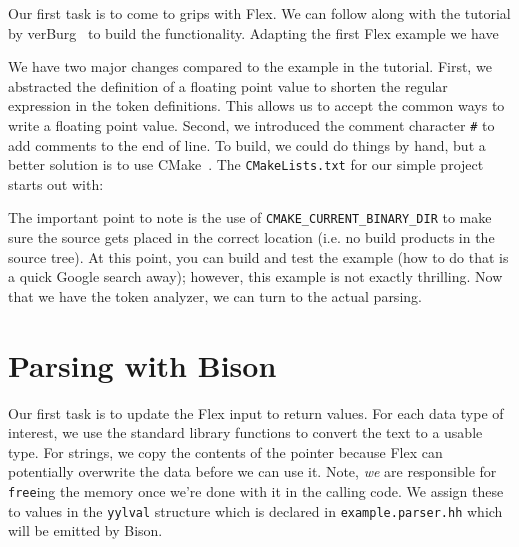 \documentclass{article}
\begin{document}
Our first task is to come to grips with Flex.  We can follow along with
the tutorial by verBurg~\cite{verburg_flex_2018} to build the
functionality.  Adapting the first Flex example we have

\begin{code block}
    
\end{code block}

We have two major changes compared to the example in the tutorial.
First, we abstracted the definition of a floating point value to shorten
the regular expression in the token definitions.  This allows us to
accept the common ways to write a floating point value.  Second, we
introduced the comment character \lstinline{#} to add comments to the
end of line.  To build, we could do things by hand, but a better
solution is to use CMake~\cite{kitware_cmake_2019}.  The
\lstinline{CMakeLists.txt} for our simple project starts out with:

\begin{code block}
    
\end{code block}

The important point to note is the use of \lstinline{CMAKE_CURRENT_BINARY_DIR}
to make sure the source gets placed in the correct location (i.e. no
build products in the source tree).  At this point, you can build and
test the example (how to do that is a quick Google search away);
however, this example is not exactly thrilling.  Now that we have the
token analyzer, we can turn to the actual parsing.

\section{Parsing with Bison}

Our first task is to update the Flex input to return values.  For each
data type of interest, we use the standard library functions to convert
the text to a usable type.  For strings, we copy the contents of the
pointer because Flex can potentially overwrite the data before we can
use it.  Note, \emph{we} are responsible for \lstinline{free}ing the
memory once we're done with it in the calling code.  We assign these to
values in the \lstinline{yylval} structure which is declared in
\lstinline{example.parser.hh} which will be emitted by Bison.

\begin{code block}
    
\end{code block}
\end{document}
